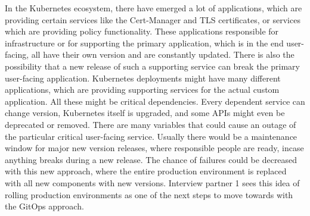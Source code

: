 In the Kubernetes ecosystem, there have emerged a lot of applications,
which are providing certain services like the Cert-Manager and TLS certificates,
or services which are providing policy functionality.
These applications responsible for infrastructure or for supporting the primary application,
which is in the end user-facing,
all have their own version and are constantly updated.
There is also the possibility that a new release of such a supporting service
can break the primary user-facing application.
Kubernetes deployments might have many different applications,
which are providing supporting services for the actual custom application.
All these might be critical dependencies. Every dependent service can change version,
Kubernetes itself is upgraded, and some APIs might even be deprecated or removed.
There are many variables that could cause an outage of the particular critical user-facing service.
Usually there would be a maintenance window for major new version releases,
where responsible people are ready, incase anything breaks during a new release.
The chance of failures could be decreased with this new approach,
where the entire production environment is replaced with all new components with new versions.
Interview partner 1 sees this idea of rolling production environments as one of the next steps to move towards with the GitOps approach.


